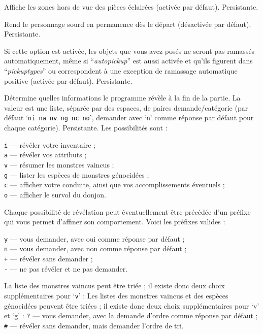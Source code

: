 \documentclass[titlepage]{article}
\begin{document}
\begin{description}[font=\mdseries\itshape]
\item[dark\textunderscore room]
Affiche les zones hors de vue des pièces éclairées (activée par défaut). Persistante.
\item[deaf]
Rend le personnage sourd en permanence dès le départ (désactivée par défaut). Persistante.
\item[dropped\textunderscore nopick]
Si cette option est activée, les objets que vous avez posés ne seront pas ramassés automatiquement,
même si ``\textit{autopickup}'' est aussi activée et qu'ils figurent dans
``\textit{pickup\textunderscore types}'' ou correspondent à une exception de ramassage automatique positive
(activée par défaut). Persistante.
\item[disclose]
Détermine quelles informations le programme révèle à la fin de la partie.
La valeur est une liste, séparée par des espaces, de paires demande/catégorie
(par défaut `\texttt{ni na nv ng nc no}',
demander avec `\texttt{n}' comme réponse par défaut pour chaque catégorie).
Persistante.
Les possibilités sont :

\texttt{i} --- révéler votre inventaire ;\\
\texttt{a} --- révéler vos attributs ;\\
\texttt{v} --- résumer les monstres vaincus ;\\
\texttt{g} --- lister les espèces de monstres génocidées ;\\
\texttt{c} --- afficher votre conduite, ainsi que vos accomplissements éventuels ;\\
\texttt{o} --- afficher le survol du donjon.

Chaque possibilité de révélation peut éventuellement être précédée d'un préfixe qui
vous permet d'affiner son comportement. Voici les préfixes valides :

\texttt{y} --- vous demander, avec oui comme réponse par défaut ;\\
\texttt{n} --- vous demander, avec non comme réponse par défaut ;\\
\texttt{+} --- révéler sans demander ;\\
\texttt{-} --- ne pas révéler et ne pas demander.

La liste des monstres vaincus peut être triée ;
il existe donc deux choix supplémentaires pour `\texttt{v}' :
Les listes des monstres vaincus et des espèces génocidées peuvent être triées ;
il existe donc deux choix supplémentaires pour `v' et `g' :
\texttt{?} --- vous demander, avec la demande d'ordre comme réponse par défaut ;\\
{\tt\#} --- révéler sans demander, mais demander l'ordre de tri.


\end{description}
\end{document}

